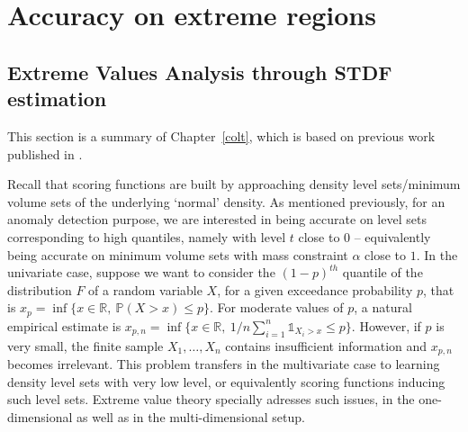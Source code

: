 






\section{Accuracy on extreme regions}
\label{resume:extreme}
\subsection{Extreme Values Analysis through STDF estimation}
\label{resume:stdf}
This section is a summary of Chapter~\ref{colt}, which is based on previous work published in \cite{COLT15}.

Recall that scoring functions are built
by approaching density level sets/minimum volume sets of the underlying `normal' density. As mentioned previously, for an anomaly detection purpose, we are interested in being accurate on level sets corresponding to high quantiles, namely with level $t$ close to $0$ -- equivalently being accurate on minimum volume sets with mass constraint $\alpha$ close to $1$.  
%
In the univariate case, suppose we want to consider the $(1-p)^{th}$ quantile of the distribution $F$ of a random variable $X$, for a given exceedance probability $p$, that is $x_p = \inf\{x \in \mathbb{R},~ \mathbb{P}(X > x) \le p\}$. For moderate values of $p$, a natural empirical estimate is $x_{p,n} = \inf\{x \in \mathbb{R},~ 1/n \sum_{i=1}^n \mathds{1}_{X_i > x}\le p\}$.
However,  if $p$ is very small, the finite  sample $X_1,\ldots, X_n$  contains insufficient information and $x_{p,n}$ becomes irrelevant.
%
This problem transfers in the multivariate case to learning density level sets with very low level, or equivalently scoring functions inducing such level sets.
%
Extreme value theory specially adresses such issues, in the one-dimensional as well as in the multi-dimensional setup.



